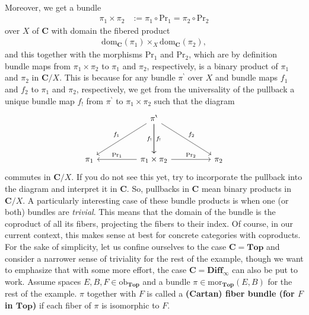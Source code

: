 \begin{exa}[Bundles 1]
\begin{align*}
\end{align*}
Moreover, we get a bundle
\begin{align*}
  \pi_{1}
  \times
  \pi_{2}
  &:=
  \pi_{1}
  \circ
  \mathrm{Pr}_{1}
  =
  \pi_{2}
  \circ
  \mathrm{Pr}_{2}
\end{align*}
over $X$ of $\mathbf{C}$ with domain the fibered product
\begin{align*}
  \mathrm{dom}_{\mathbf{C}}(\pi_{1})
  \times_{X}
  \mathrm{dom}_{\mathbf{C}}(\pi_{2}),
\end{align*}
and this together with the morphisms $\mathrm{Pr}_{1}$ and $\mathrm{Pr}_{2}$, which are by definition bundle maps from $\pi_{1} \times \pi_{2}$ to $\pi_{1}$ and $\pi_{2}$, respectively, is a binary product of $\pi_{1}$ and $\pi_{2}$ in $\mathbf{C} \slash X$.
This is because for any bundle $\pi^{\backprime}$ over $X$ and bundle maps $f_{1}$ and $f_{2}$ to $\pi_{1}$ and $\pi_{2}$, respectively, we get from the universality of the pullback a unique bundle map $f_{!}$ from $\pi^{\backprime}$ to $\pi_{1} \times \pi_{2}$ such that the diagram
\[
\begin{tikzcd}[sep=huge]
  &
  \pi^{\backprime}
  \arrow{dr}{f_{2}}
  \arrow{d}{f_{!}}
  \arrow[swap]{d}{f_{!}}
  \arrow[swap]{dl}{f_{1}}
  &
  \\
  \pi_{1}
  &
  \pi_{1} \times \pi_{2}
  \arrow{r}{\mathrm{Pr}_{2}}
  \arrow[swap]{l}{\mathrm{Pr}_{1}}
  &
  \pi_{2}
\end{tikzcd}
\]
commutes in $\mathbf{C} \slash X$.
If you do not see this yet, try to incorporate the pullback into the diagram and interpret it in $\mathbf{C}$.
So, pullbacks in $\mathbf{C}$ mean binary products in $\mathbf{C} \slash X$.
A particularly interesting case of these bundle products is when one (or both) bundles are \textit{trivial}.
This means that the domain of the bundle is the coproduct of all its fibers, projecting the fibers to their index.
Of course, in our current context, this makes sense at best for concrete categories with coproducts.
For the sake of simplicity, let us confine ourselves to the case $\mathbf{C} = \mathbf{Top}$ and consider a narrower sense of triviality for the rest of the example, though we want to emphasize that with some more effort, the case $\mathbf{C} = \mathbf{Diff}_{\infty}$ can also be put to work.
Assume spaces $E,B,F \in \mathrm{ob}_{\mathbf{Top}}$ and a bundle $\pi \in \mathrm{mor}_{\mathbf{Top}}(E,B)$ for the rest of the example.
$\pi$ together with $F$ is called a \textbf{(Cartan) fiber bundle (for $F$ in $\mathbf{Top}$)} if each fiber of $\pi$ is isomorphic to $F$.

\end{exa}
